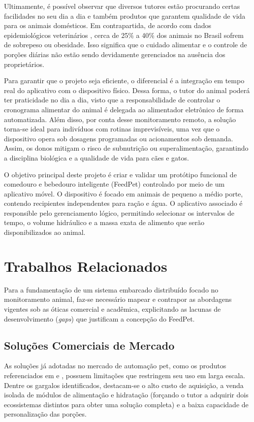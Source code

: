 \documentclass[12pt]{article}\usepackage{sbc-template}\usepackage{graphicx,url}\usepackage[utf8]{inputenc}
\begin{document}
Ultimamente, é possível observar que diversos tutores estão procurando certas facilidades no seu dia a dia e também produtos que garantem qualidade de vida para os animais domésticos. Em contrapartida, de acordo com dados epidemiológicos veterinários \cite{folha:23}, cerca de 25\% a 40\% dos animais no Brasil sofrem de sobrepeso ou obesidade. Isso significa que o cuidado alimentar e o controle de porções diárias não estão sendo devidamente gerenciados na ausência dos proprietários.

Para garantir que o projeto seja eficiente, o diferencial é a integração em tempo real do aplicativo com o dispositivo físico. Dessa forma, o tutor do animal poderá ter praticidade no dia a dia, visto que a responsabilidade de controlar o cronograma alimentar do animal é delegada ao alimentador eletrônico de forma automatizada. Além disso, por conta desse monitoramento remoto, a solução torna-se ideal para indivíduos com rotinas imprevisíveis, uma vez que o dispositivo opera sob dosagens programadas ou acionamentos sob demanda. Assim, os donos mitigam o risco de subnutrição ou superalimentação, garantindo a disciplina biológica e a qualidade de vida para cães e gatos.

O objetivo principal deste projeto é criar e validar um protótipo funcional de comedouro e bebedouro inteligente (FeedPet) controlado por meio de um aplicativo móvel. O dispositivo é focado em animais de pequeno a médio porte, contendo recipientes independentes para ração e água. O aplicativo associado é responsible pelo gerenciamento lógico, permitindo selecionar os intervalos de tempo, o volume hidráulico e a massa exata de alimento que serão disponibilizados ao animal.

\section{Trabalhos Relacionados}

Para a fundamentação de um sistema embarcado distribuído focado no monitoramento animal, faz-se necessário mapear e contrapor as abordagens vigentes sob as óticas comercial e acadêmica, explicitando as lacunas de desenvolvimento (\textit{gaps}) que justificam a concepção do FeedPet.

\subsection{Soluções Comerciais de Mercado}
As soluções já adotadas no mercado de automação pet, como os produtos referenciados em \cite{onizoomi:26} e \cite{surecare:26}, possuem limitações que restringem seu uso em larga escala. Dentre os gargalos identificados, destacam-se o alto custo de aquisição, a venda isolada de módulos de alimentação e hidratação (forçando o tutor a adquirir dois ecossistemas distintos para obter uma solução completa) e a baixa capacidade de personalização das porções. 
\end{document}
